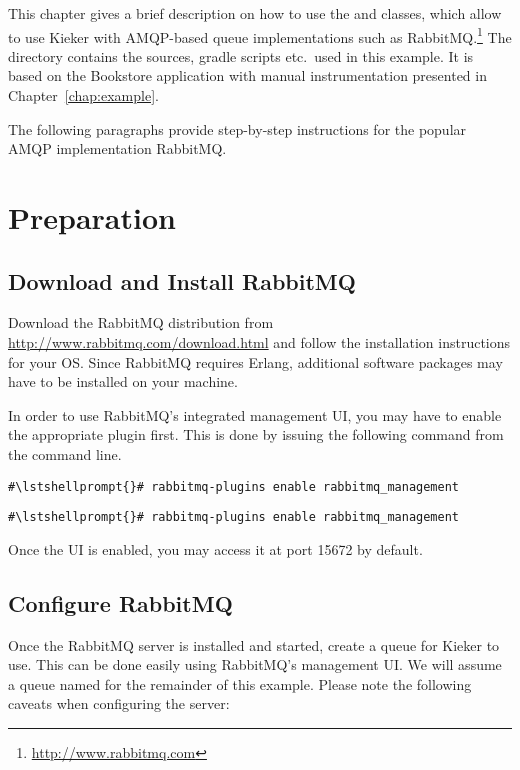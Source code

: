 This chapter gives a brief description on how to use the  and  %
classes, which allow to use Kieker with AMQP-based queue implementations such as %
RabbitMQ.\footnote{\url{http://www.rabbitmq.com}} The directory \dir{\AMQPBookstoreApplicationReleaseDirDistro/} %
contains the sources, gradle scripts etc.\ used in this example. It is based on the Bookstore %
application with manual instrumentation presented in Chapter~\ref{chap:example}. %

The following paragraphs provide step-by-step instructions for the popular AMQP implementation RabbitMQ.%

\section{Preparation}

\subsection{Download and Install RabbitMQ}
Download the RabbitMQ distribution from \url{http://www.rabbitmq.com/download.html} and follow the installation %
instructions for your OS. Since RabbitMQ requires Erlang, additional software packages may have to be installed %
on your machine.
\par In order to use RabbitMQ's integrated management UI, you may have to enable the appropriate plugin first. This is %
done by issuing the following command from the command line. 

\setBashListing
\begin{lstlisting}[caption=Enable the management UI under UNIX-like systems]
#\lstshellprompt{}# rabbitmq-plugins enable rabbitmq_management
\end{lstlisting}
\begin{lstlisting}[caption=Enable the management UI under Windows]
#\lstshellprompt{}# rabbitmq-plugins enable rabbitmq_management
\end{lstlisting}

Once the UI is enabled, you may access it at port 15672 by default. %

\subsection{Configure RabbitMQ}
Once the RabbitMQ server is installed and started, create a queue for Kieker to use. This can be done easily using %
RabbitMQ's management UI. We will assume a queue named  for the remainder of this %
example. Please note the following caveats when configuring the server:

